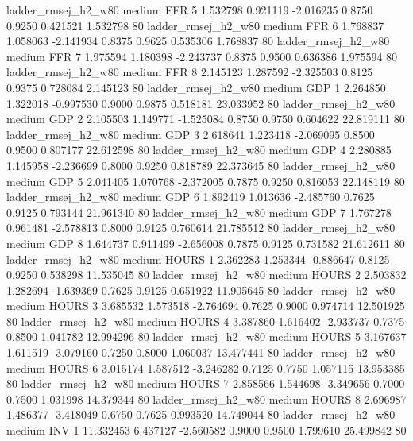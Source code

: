    ladder_rmsej_h2_w80     medium      FFR                 5  1.532798 0.921119 -2.016235 0.8750 0.9250  0.421521    1.532798 80
   ladder_rmsej_h2_w80     medium      FFR                 6  1.768837 1.058063 -2.141934 0.8375 0.9625  0.535306    1.768837 80
   ladder_rmsej_h2_w80     medium      FFR                 7  1.975594 1.180398 -2.243737 0.8375 0.9500  0.636386    1.975594 80
   ladder_rmsej_h2_w80     medium      FFR                 8  2.145123 1.287592 -2.325503 0.8125 0.9375  0.728084    2.145123 80
   ladder_rmsej_h2_w80     medium      GDP                 1  2.264850 1.322018 -0.997530 0.9000 0.9875  0.518181   23.033952 80
   ladder_rmsej_h2_w80     medium      GDP                 2  2.105503 1.149771 -1.525084 0.8750 0.9750  0.604622   22.819111 80
   ladder_rmsej_h2_w80     medium      GDP                 3  2.618641 1.223418 -2.069095 0.8500 0.9500  0.807177   22.612598 80
   ladder_rmsej_h2_w80     medium      GDP                 4  2.280885 1.145958 -2.236699 0.8000 0.9250  0.818789   22.373645 80
   ladder_rmsej_h2_w80     medium      GDP                 5  2.041405 1.070768 -2.372005 0.7875 0.9250  0.816053   22.148119 80
   ladder_rmsej_h2_w80     medium      GDP                 6  1.892419 1.013636 -2.485760 0.7625 0.9125  0.793144   21.961340 80
   ladder_rmsej_h2_w80     medium      GDP                 7  1.767278 0.961481 -2.578813 0.8000 0.9125  0.760614   21.785512 80
   ladder_rmsej_h2_w80     medium      GDP                 8  1.644737 0.911499 -2.656008 0.7875 0.9125  0.731582   21.612611 80
   ladder_rmsej_h2_w80     medium    HOURS                 1  2.362283 1.253344 -0.886647 0.8125 0.9250  0.538298   11.535045 80
   ladder_rmsej_h2_w80     medium    HOURS                 2  2.503832 1.282694 -1.639369 0.7625 0.9125  0.651922   11.905645 80
   ladder_rmsej_h2_w80     medium    HOURS                 3  3.685532 1.573518 -2.764694 0.7625 0.9000  0.974714   12.501925 80
   ladder_rmsej_h2_w80     medium    HOURS                 4  3.387860 1.616402 -2.933737 0.7375 0.8500  1.041782   12.994296 80
   ladder_rmsej_h2_w80     medium    HOURS                 5  3.167637 1.611519 -3.079160 0.7250 0.8000  1.060037   13.477441 80
   ladder_rmsej_h2_w80     medium    HOURS                 6  3.015174 1.587512 -3.246282 0.7125 0.7750  1.057115   13.953385 80
   ladder_rmsej_h2_w80     medium    HOURS                 7  2.858566 1.544698 -3.349656 0.7000 0.7500  1.031998   14.379344 80
   ladder_rmsej_h2_w80     medium    HOURS                 8  2.696987 1.486377 -3.418049 0.6750 0.7625  0.993520   14.749044 80
   ladder_rmsej_h2_w80     medium      INV                 1 11.332453 6.437127 -2.560582 0.9000 0.9500  1.799610   25.499842 80
